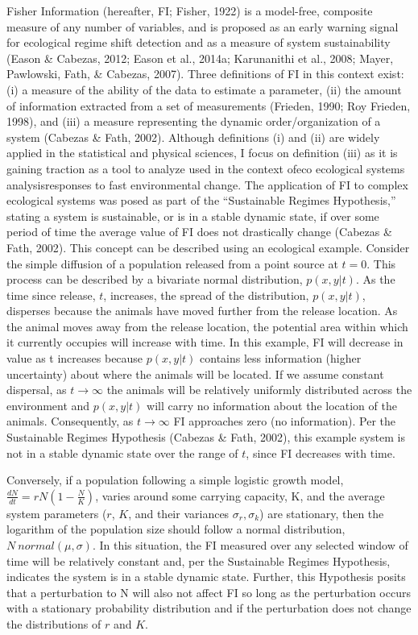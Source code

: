 \documentclass[12pt,twoside,openany]{reedthesis}
\begin{document}
Fisher Information (hereafter, FI; Fisher, 1922) is a model-free, composite measure of any number of variables, and is proposed as an early warning signal for ecological regime shift detection and as a measure of system sustainability (Eason \& Cabezas, 2012; Eason et al., 2014a; Karunanithi et al., 2008; Mayer, Pawlowski, Fath, \& Cabezas, 2007). Three definitions of FI in this context exist: (i) a measure of the ability of the data to estimate a parameter, (ii) the amount of information extracted from a set of measurements (Frieden, 1990; Roy Frieden, 1998), and (iii) a measure representing the dynamic order/organization of a system (Cabezas \& Fath, 2002). Although definitions (i) and (ii) are widely applied in the statistical and physical sciences, I focus on definition (iii) as it is gaining traction as a tool to analyze used in the context ofeco ecological systems analysisresponses to fast environmental change. The application of FI to complex ecological systems was posed as part of the ``Sustainable Regimes Hypothesis,'' stating a system is sustainable, or is in a stable dynamic state, if over some period of time the average value of FI does not drastically change (Cabezas \& Fath, 2002). This concept can be described using an ecological example. Consider the simple diffusion of a population released from a point source at \(t=0\). This process can be described by a bivariate normal distribution, \(p(x,y|t)\). As the time since release, \(t\), increases, the spread of the distribution, \(p(x,y|t)\), disperses because the animals have moved further from the release location. As the animal moves away from the release location, the potential area within which it currently occupies will increase with time. In this example, FI will decrease in value as t increases because \(p(x,y|t)\) contains less information (higher uncertainty) about where the animals will be located. If we assume constant dispersal, as \(t\rightarrow\infty\) the animals will be relatively uniformly distributed across the environment and \(p(x,y|t)\) will carry no information about the location of the animals. Consequently, as \(t\rightarrow\infty\) FI approaches zero (no information). Per the Sustainable Regimes Hypothesis (Cabezas \& Fath, 2002), this example system is not in a stable dynamic state over the range of \(t\), since FI decreases with time.

Conversely, if a population following a simple logistic growth model, \(\frac{dN}{dt}=rN(1-\frac{N}{K})\), varies around some carrying capacity, K, and the average system parameters (\(r\), \(K\), and their variances \(\sigma_r, \sigma_k\)) are stationary, then the logarithm of the population size should follow a normal distribution, \(N ~ normal(\mu,\sigma)\). In this situation, the FI measured over any selected window of time will be relatively constant and, per the Sustainable Regimes Hypothesis, indicates the system is in a stable dynamic state. Further, this Hypothesis posits that a perturbation to N will also not affect FI so long as the perturbation occurs with a stationary probability distribution and if the perturbation does not change the distributions of \(r\) and \(K\).
\end{document}
